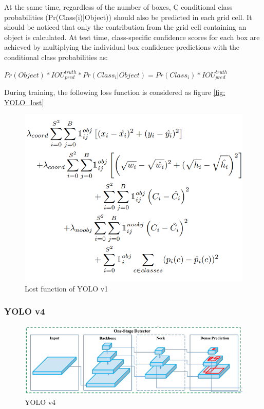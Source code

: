 At the same time, regardless of the number of boxes, C conditional class probabilities (Pr(Class(i)|Object)) should also be predicted in
each grid cell. It should be noticed that only the contribution from the grid cell containing an object is calculated. 
At test time, class-specific confidence scores for each box are achieved by multiplying the individual box confidence predictions with the conditional class probabilities as:
\begin{center}
    $Pr(Object) * IOU_{pred}^{truth} * Pr(Class_i|Object) = Pr(Class_i) *IOU_{pred}^{truth}$
\end{center}
During training, the following loss function is considered as figure \ref{fig: YOLO_lost}
\begin{figure}[!t]
\centering
\includegraphics[width=14cm]{Images/recognition/YOLO_lost.png}
\caption{Lost function of YOLO v1}
\label{fig: YOLO lost}
\end{figure}

\subsubsection{YOLO v4}
\begin{figure}[!t]
\centering
\includegraphics[width=14cm]{Images/recognition/YOLO_v4.png}
\caption{YOLO v4}
\label{fig: YOLO v4}
\end{figure}

